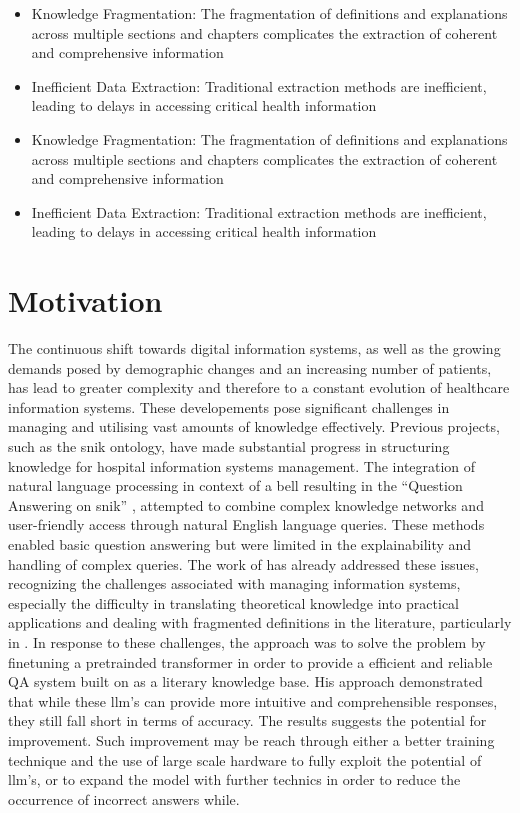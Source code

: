\begin{itemize}
\item Knowledge Fragmentation: The fragmentation of definitions and explanations across multiple sections and chapters complicates the extraction of coherent and comprehensive information
\item Inefficient Data Extraction: Traditional extraction methods are inefficient, leading to delays in accessing critical health information
%
\end{itemize}
\begin{itemize}
\item Knowledge Fragmentation: The fragmentation of definitions and explanations across multiple sections and chapters complicates the extraction of coherent and comprehensive information
\item Inefficient Data Extraction: Traditional extraction methods are inefficient, leading to delays in accessing critical health information

\end{itemize}
\section{Motivation}
The continuous shift towards digital information systems, as well as the growing demands posed by demographic changes and an increasing number of patients, has lead to greater complexity and therefore to a constant evolution of healthcare information systems. 
These developements pose significant challenges in managing and utilising vast amounts of knowledge effectively. Previous projects, such as the \ac{snik} ontology, have made substantial progress in structuring knowledge for hospital information systems management. 
The integration of natural language processing in context of a \ac{bell} resulting in the \enquote{Question Answering on \ac{snik}} \citep{hannesbell, hannesbell_skill}, attempted to combine complex knowledge networks and user-friendly access through natural English language queries. 
These methods enabled basic question answering but were limited in the explainability and handling of complex queries.
The work of \citet{Paul_Keller} has already addressed these issues, recognizing the challenges associated with managing information systems, especially the difficulty in translating theoretical knowledge into practical applications and dealing with fragmented definitions in the literature, particularly in \citet{bb2}. 
In response to these challenges, the approach was to solve the problem by finetuning a pretrainded transformer in order to provide a efficient and reliable QA system built on \citet{bb2} as a literary knowledge base.
His approach demonstrated that while these \ac{llm}'s can provide more intuitive and comprehensible responses, they still fall short in terms of accuracy. 
The results suggests the potential for improvement. 
Such improvement may be reach through either a better training technique and the use of large scale hardware to fully exploit the potential of \ac{llm}'s, or to expand the model with further technics in order to reduce the occurrence of incorrect answers while.


